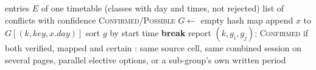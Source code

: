 \begin{algorithm}[H]
\caption{Detect professor, room and batch clashes}\label{alg:conflict}
\begin{algorithmic}[1]
\Require entries $E$ of one timetable (classes with day and times, not rejected)
\Ensure list of conflicts with confidence \textsc{Confirmed}/\textsc{Possible}
\State $G \gets$ empty hash map
     \State append $x$ to $G[(k, \mathit{key}, x.\mathit{day})]$ 
  \EndFor
\EndFor
{}
   \State sort $g$ by start time
         \textbf{break} \EndIf
            \State report $(k, g_i, g_j)$; \textsc{Confirmed} if both verified, mapped and certain
        \EndIf
     \EndFor
   \EndFor
\EndFor
{}: same source cell, same combined session on several pages, parallel
elective options, or a sub-group's own written period \EndFunction
\end{algorithmic}
\end{algorithm}
